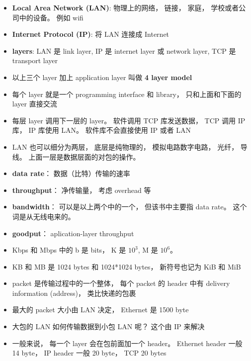 \begin{itemize}
\item \textbf{Local Area Network (LAN)}: 物理上的网络， 链接， 家庭， 学校或者公司中的设备。 例如 wifi
\item \textbf{Internet Protocol (IP)}: 将 LAN 连接成 Internet
\item \textbf{layers}: LAN 是 link layer, IP 是 internet layer 或 network layer, TCP 是 transport layer
\item 以上三个 layer 加上 application layer 叫做 \textbf{4 layer model}
\item 每个 layer 就是一个 programming interface 和 library， 只和上面和下面的 layer 直接交流
\item 每层 layer 调用下一层的 layer。 软件调用 TCP 库发送数据， TCP 调用 IP 库， IP 库使用 LAN。 软件库不会直接使用 IP 或者 LAN
\item LAN 也可以细分为两层， 底层是纯物理的， 模拟电路数字电路， 光纤， 导线。 上面一层是数据层面的对包的操作。
\item \textbf{data rate}： 数据（比特）传输的速率
\item \textbf{throughput}： 净传输量， 考虑 overhead 等
\item \textbf{bandwidth}： 可以是以上两个中的一个， 但该书中主要指 data rate。 这个词是从无线电来的。
\item \textbf{goodput}： aplication-layer throughput
\item Kbps 和 Mbps 中的 b 是 bits， K 是 $10^3$, M 是 $10^6$。
\item KB 和 MB 是 1024 bytes 和 1024*1024 bytes， 新符号也记为 KiB 和 MiB
\item packet 是传输过程中的一个整体， 每个 packet 的 header 中有 delivery information (address)， 类比快递的包裹
\item 最大的 packet 大小由 LAN 决定， Ethernet 是 1500 byte
\item 大包的 LAN 如何传输数据到小包 LAN 呢？ 这个由 IP 来解决
\item 一般来说， 每一个 layer 会在包前面加一个 header。 Ethernet header 一般 14 byte， IP header 一般 20 byte， TCP 20 bytes
\end{itemize}

